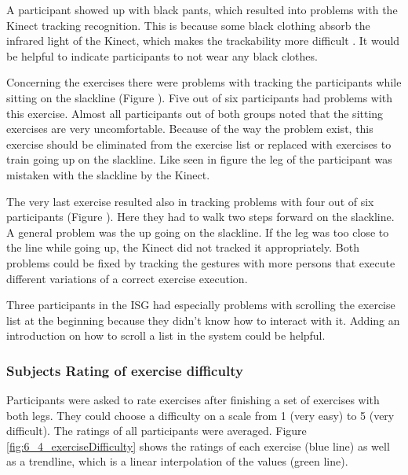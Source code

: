 A participant showed up with black pants, which resulted into problems with the Kinect tracking recognition.
This is because some black clothing absorb the infrared light of the Kinect, which makes the trackability more difficult \cite{KinectBlackClothing}.
It would be helpful to indicate participants to not wear any black clothes.

Concerning the exercises there were problems with tracking the participants while sitting on the slackline (Figure ).
Five out of six participants had problems with this exercise.
Almost all participants out of both groups noted that the sitting exercises are very uncomfortable.
Because of the way the problem exist, this exercise should be eliminated from the exercise list or replaced with exercises to train going up on the slackline.
Like seen in figure  the leg of the participant was mistaken with the slackline by the Kinect.

The very last exercise resulted also in tracking problems with four out of six participants (Figure ).
Here they had to walk two steps forward on the slackline.
A general problem was the up going on the slackline.
If the leg was too close to the line while going up, the Kinect did not tracked it appropriately.
Both problems could be fixed by tracking the gestures with more persons that execute different variations of a correct exercise execution.

Three participants in the ISG had especially problems with scrolling the exercise list at the beginning because they didn't know how to interact with it.
Adding an introduction on how to scroll a list in the system could be helpful.

\subsubsection{Subjects Rating of exercise difficulty}
Participants were asked to rate exercises after finishing a set of exercises with both legs.
They could choose a difficulty on a scale from 1 (very easy) to 5 (very difficult).
The ratings of all participants were averaged.
Figure \ref{fig:6_4_exerciseDifficulty} shows the ratings of each exercise (blue line) as well as a trendline, which is a linear interpolation of the values (green line).

